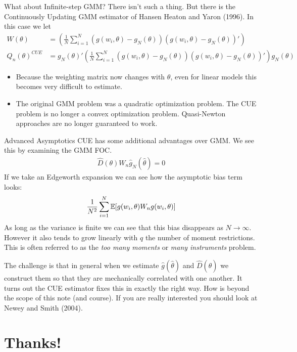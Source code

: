 \begin{frame}{What about Infinite-step GMM?}
 There isn't such a thing. But there is the \alert{Continuously Updating GMM} estimator of Hansen Heaton and Yaron (1996). In this case we let \\
\begin{align*}
W(\theta)&=\left(\frac{1}{N} \sum_{i=1}^N (g(w_i,\theta) - g_N(\theta)) (g(w_i,\theta)-g_N(\theta))' \right) \\
Q_n(\theta)^{CUE} &= g_N(\theta)' \left(\frac{1}{N} \sum_{i=1}^N (g(w_i,\theta) - g_N(\theta)) (g(w_i,\theta)-g_N(\theta))' \right) g_N(\theta)
\end{align*}
\begin{itemize}
\item Because the weighting matrix now changes with $\theta$, even for linear models this becomes very difficult to estimate. 
\item The original GMM problem was a quadratic optimization problem. The CUE problem is no longer a convex optimization problem. Quasi-Newton approaches are no longer guaranteed to work.
\end{itemize}
\end{frame}

\begin{frame}{Advanced Asymptotics}
\small
CUE has some additional advantages over GMM. We see this by examining the GMM FOC. 
\begin{eqnarray*}
\hat{D}(\theta) W_n \hat{g}_N(\hat{\theta}) =0
\end{eqnarray*}
If we take an Edgeworth expansion we can see how the  \alert{asymptotic bias} term looks:
\begin{eqnarray*}
\frac{1}{N^2}\sum_{i=1}^N \mathbb{E}[g(w_i,\theta) W_n g(w_i,\theta)]
\end{eqnarray*}
As long as the variance is finite we can see that this bias disappears as $N \rightarrow \infty$. However it also tends to grow linearly with $q$ the number of moment restrictions. This is often referred to as the \textit{too many moments} or \textit{many instruments} problem.

The challenge is that in general when we estimate $\hat{g}(\hat{\theta})$ and $\hat{D}(\hat{\theta})$ we construct them so that they are mechanically correlated with one another. It turns out the CUE estimator fixes this in exactly the right way. How is beyond the scope of this note (and course). If you are really interested you should look at Newey and Smith (2004).

\end{frame}

\section*{Thanks!}

